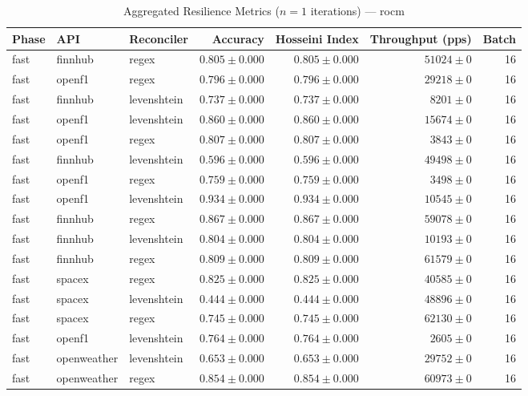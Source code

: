 
\begin{table}[htbp]
\caption{Aggregated Resilience Metrics ($n=1$ iterations) --- rocm}
\begin{tabular}{l l l r r r r}
\hline
Phase & API & Reconciler & Accuracy & Hosseini Index & Throughput (pps) & Batch \\
\hline
fast & finnhub & regex & $0.805\pm0.000$ & $0.805\pm0.000$ & $51024\pm0$ & 16 \\
fast & openf1 & regex & $0.796\pm0.000$ & $0.796\pm0.000$ & $29218\pm0$ & 16 \\
fast & finnhub & levenshtein & $0.737\pm0.000$ & $0.737\pm0.000$ & $8201\pm0$ & 16 \\
fast & openf1 & levenshtein & $0.860\pm0.000$ & $0.860\pm0.000$ & $15674\pm0$ & 16 \\
fast & openf1 & regex & $0.807\pm0.000$ & $0.807\pm0.000$ & $3843\pm0$ & 16 \\
fast & finnhub & levenshtein & $0.596\pm0.000$ & $0.596\pm0.000$ & $49498\pm0$ & 16 \\
fast & openf1 & regex & $0.759\pm0.000$ & $0.759\pm0.000$ & $3498\pm0$ & 16 \\
fast & openf1 & levenshtein & $0.934\pm0.000$ & $0.934\pm0.000$ & $10545\pm0$ & 16 \\
fast & finnhub & regex & $0.867\pm0.000$ & $0.867\pm0.000$ & $59078\pm0$ & 16 \\
fast & finnhub & levenshtein & $0.804\pm0.000$ & $0.804\pm0.000$ & $10193\pm0$ & 16 \\
fast & finnhub & regex & $0.809\pm0.000$ & $0.809\pm0.000$ & $61579\pm0$ & 16 \\
fast & spacex & regex & $0.825\pm0.000$ & $0.825\pm0.000$ & $40585\pm0$ & 16 \\
fast & spacex & levenshtein & $0.444\pm0.000$ & $0.444\pm0.000$ & $48896\pm0$ & 16 \\
fast & spacex & regex & $0.745\pm0.000$ & $0.745\pm0.000$ & $62130\pm0$ & 16 \\
fast & openf1 & levenshtein & $0.764\pm0.000$ & $0.764\pm0.000$ & $2605\pm0$ & 16 \\
fast & openweather & levenshtein & $0.653\pm0.000$ & $0.653\pm0.000$ & $29752\pm0$ & 16 \\
fast & openweather & regex & $0.854\pm0.000$ & $0.854\pm0.000$ & $60973\pm0$ & 16 \\

\end{tabular}
\end{table}
